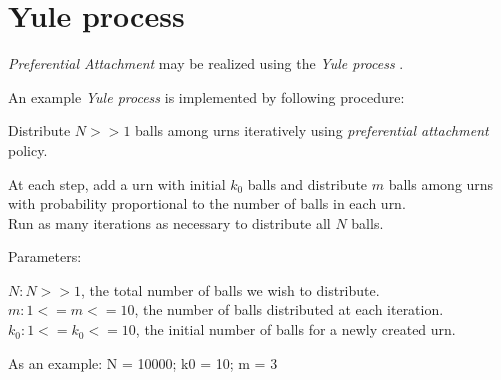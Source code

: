 \documentclass[a4paper, 12pt]{report}
\begin{document}
\section{Yule process}
\par \textit{Preferential Attachment} may be realized using the \textit{Yule process}  \cite{yule-simon-distribution}.

\par An example \textit{Yule process} is implemented by following procedure:
\par Distribute $N >> 1$ balls among urns iteratively using \textit{preferential attachment} policy.

At each step, add a urn with initial $k_0$ balls and distribute $m$ balls among urns with probability proportional to the number of balls in each urn.\\
Run as many iterations as necessary to distribute all $N$ balls.

\par Parameters:
\begin{addmargin}[1cm]{1cm}%
    $N: N >> 1$, the total number of balls we wish to distribute.\\
    $m: 1 <= m <= 10$, the number of balls distributed at each iteration.\\
    $k_0: 1 <= k_0 <= 10$, the initial number of balls for a newly created urn.
\end{addmargin}

{\selectfont
As an example: N = 10000; k0 = 10; m = 3
}
\end{document}
